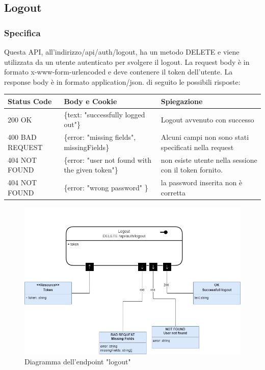 \documentclass{report}
\begin{document}
\subsection{Logout}
\subsubsection*{Specifica}


Questa API, all'indirizzo/api/auth/logout, ha un metodo DELETE e viene utilizzata da un utente autenticato per svolgere il logout.
La request body è in formato x-www-form-urlencoded e deve contenere il token dell'utente.
La response body è in formato application/json. di seguito le possibili risposte:
\begin{center} %
	\centering
	\begin{tabular}{ |p{4cm}|p{5cm}|p{4cm}| }
		\hline
		\centering Status Code & \qquad\quad Body e Cookie                        & \qquad\qquad Spiegazione                               \\ %
		\hline
		200 OK                 & \{text: "successfully logged out"\}              & Logout avvenuto con successo                           \\
		\hline
		400 BAD REQUEST        & \{error: "missing fields", missingFields\}       & Alcuni campi non sono stati specificati nella request  \\ %
		\hline
		404 NOT FOUND          & \{error: "user not found with the given token"\} & non esiste utente nella sessione con il token fornito. \\%
		\hline
		404 NOT FOUND          & \{error: "wrong password" \}                     & la password inserita non è corretta                    \\
		\hline
	\end{tabular}
\end{center}
\begin{figure}[H]
	\centering\includegraphics[width=1\textwidth]{images/microservizio-autenticazione/diagrams/diagramma_logout.drawio.png}
	\caption{Diagramma dell'endpoint "logout"}
\end{figure}
\end{document}
